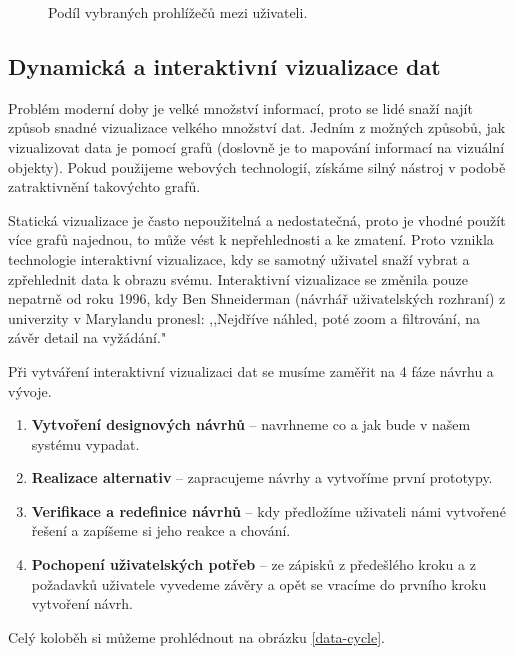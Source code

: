 \begin{figure}[H]
\centering
{}
\caption{Podíl vybraných prohlížečů mezi uživateli.}
\label{browser-share}
\end{figure}
\subsection{Dynamická a interaktivní vizualizace dat}
\par Problém moderní doby je velké množství informací, proto se lidé snaží najít způsob snadné vizualizace velkého množství dat. Jedním z možných způsobů, jak vizualizovat data je pomocí grafů (doslovně je to mapování informací na vizuální objekty). Pokud použijeme webových technologií, získáme silný nástroj v podobě zatraktivnění takovýchto grafů. \cite{interactive-data-reily}

\par Statická vizualizace je často nepoužitelná a nedostatečná, proto je vhodné použít více grafů najednou, to může vést k nepřehlednosti a ke zmatení. Proto vznikla technologie interaktivní vizualizace, kdy se samotný uživatel snaží vybrat a zpřehlednit data k obrazu svému. Interaktivní vizualizace se změnila pouze nepatrně od roku 1996, kdy Ben Shneiderman (návrhář uživatelských rozhraní) z univerzity v Marylandu pronesl: ,,Nejdříve náhled, poté zoom a filtrování, na závěr detail na vyžádání."\cite{interactive-data-reily}

\par Při vytváření interaktivní vizualizaci dat se musíme zaměřit na 4 fáze návrhu a vývoje.
\begin{enumerate}
\item \textbf{Vytvoření designových návrhů} -- navrhneme co a jak bude v našem systému vypadat.
\item \textbf{Realizace alternativ} -- zapracujeme návrhy a vytvoříme první prototypy.
\item \textbf{Verifikace a redefinice návrhů} -- kdy předložíme uživateli námi vytvořené řešení a zapíšeme si jeho reakce a chování.
\item \textbf{Pochopení uživatelských potřeb} -- ze zápisků z předešlého kroku a z požadavků uživatele vyvedeme závěry a opět se vracíme do prvního kroku vytvoření návrh. \cite{the-ux-book}
\end{enumerate}
 Celý koloběh si můžeme prohlédnout na obrázku \ref{data-cycle}.

